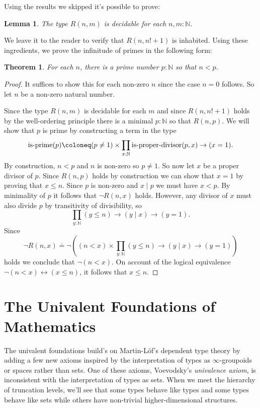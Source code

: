 \documentclass{amsart}
\theoremstyle{theorem}
\newtheorem*{thm}{Theorem}
\newtheorem*{lem}{Lemma}
\theoremstyle{definition}
\theoremstyle{remark}
\newcommand{\0}{\mathbbe{0}}
\newcommand{\1}{\mathbbe{1}}
\newcommand{\2}{\mathbbe{2}}
\newcommand{\3}{\mathbbe{3}}
\newcommand{\4}{\mathbbe{4}}
\newcommand{\type}[1]{{\textup{#1}}}
\newcommand{\bN}{{\mathbb{N}}}
\begin{document}
Using the results we skipped it's possible to prove:

\begin{lem} The type $R(n,m)$ is decidable for each $n, m : \bN$.
\end{lem}

We leave it to the reader to verify that $R(n,n!+1)$ is inhabited. Using these ingredients, we prove the infinitude of primes in the following form:

\begin{thm} For each $n$, there is a prime number $p : \bN$ so that $n < p$.
  \end{thm}
  \begin{proof}
    It suffices to show this for each non-zero $n$ since the case $n=0$ follows. So let $n$ be a non-zero natural number.

    Since the type $R(n,m)$ is decidable for each $m$ and since $R(n,n!+1)$ holds by the well-ordering principle there is a minimal $p : \bN$ so that $R(n,p)$. We will show that $p$ is prime by constructing a term in the type
    \[ \type{is-prime}(p) \coloneq (p \neq 1) \times \prod_{x: \bN} \type{is-proper-divisor}(p,x) \to (x = 1).\]
    By construction, $n < p$ and $n$ is non-zero so $p \neq 1$. So now let $x$ be a proper divisor of $p$. Since $R(n,p)$ holds by construction we can show that $x=1$ by proving that $x \leq n$. Since $p$ is non-zero and $x \mid p$ we must have $x < p$. By minimality of $p$ it follows that $\neg R(n,x)$ holds. However, any divisor of $x$ must also divide $p$ by transitivity of divisibility, so \[
      \prod_{y : \bN} (y \leq n) \to (y \mid x) \to (y=1).\]
    Since \[\neg R(n,x) \doteq \neg \left((n < x) \times \prod_{y : \bN} (y \leq n) \to (y \mid x) \to (y=1) \right)\]
         holds we conclude that $\neg(n < x)$. On account of the logical equivalence $\neg(n < x ) \leftrightarrow (x \leq n)$, it follows that $x \leq n$.
  \end{proof}
 
  
\part{The Univalent Foundations of Mathematics}

The univalent foundations build's on Martin-L\"{o}f's dependent type theory by adding a few new axioms inspired by the interpretation of types as $\infty$-groupoids or spaces rather than sets. One of these axioms, Voevodsky's \emph{univalence axiom}, is inconsistent with the interpretation of types as sets. When we meet the hierarchy of truncation levels, we'll see that some types behave like types and some types behave like sets while others have non-trivial higher-dimensional structures. 
\end{document}
